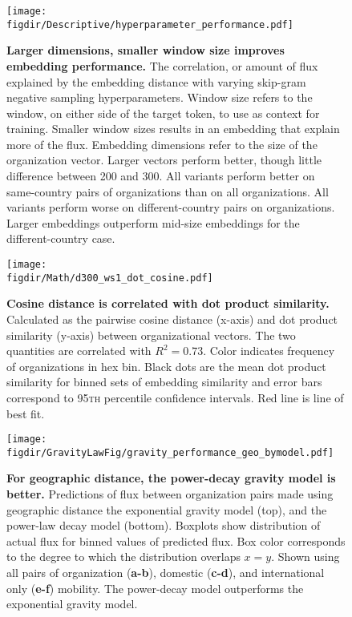 \documentclass[12pt]{article} %
\def\figdir{../Figs}
\begin{document}
%
%
\begin{figure}[p!]
	\centering
	\texttt{[image: \\figdir/Descriptive/hyperparameter\_performance.pdf]}
	\caption{
		\textbf{Larger dimensions, smaller window size improves embedding performance.}
		The correlation, or amount of flux explained by the embedding distance with varying skip-gram negative sampling hyperparameters.
		Window size refers to the window, on either side of the target token, to use as context for training.
		Smaller window sizes results in an embedding that explain more of the flux.
		Embedding dimensions refer to the size of the organization vector.
		Larger vectors perform better, though little difference between 200 and 300.
		All variants perform better on same-country pairs of organizations than on all organizations.
		All variants perform worse on different-country pairs on organizations.
		Larger embeddings outperform mid-size embeddings for the different-country case.
	}
	\label{fig:supp:cosdot}
\end{figure}


%
%
\begin{figure}[p!]
	\centering
	\texttt{[image: \\figdir/Math/d300\_ws1\_dot\_cosine.pdf]}
	\caption{
		\textbf{Cosine distance is correlated with dot product similarity.}
		Calculated as the pairwise cosine distance (x-axis) and dot product similarity (y-axis) between organizational vectors. 
		The two quantities are correlated with $R^{2} = 0.73$. 
		Color indicates frequency of organizations in hex bin. 
		Black dots are the mean dot product similarity for binned sets of embedding similarity and error bars correspond to 95\textsc{th} percentile confidence intervals. 
		Red line is line of best fit.
	}
	\label{fig:supp:hyperparams}
\end{figure}



%
%
\begin{figure}[p!]
	\centering
	\texttt{[image: \\figdir/GravityLawFig/gravity\_performance\_geo\_bymodel.pdf]}
	\caption{
		\textbf{For geographic distance, the power-decay gravity model is better.}
		Predictions of flux between organization pairs made using geographic distance the exponential gravity model (top), and the power-law decay model (bottom). 
		Boxplots show distribution of actual flux for binned values of predicted flux.
		Box color corresponds to the degree to which the distribution overlaps $x = y$.
		Shown using all pairs of organization (\textbf{a-b}), domestic (\textbf{c-d}), and international only (\textbf{e-f}) mobility. 
		The power-decay model outperforms the exponential gravity model.
	}
	\label{fig:supp:predict_geo_bymodel}
\end{figure}
\end{document}
